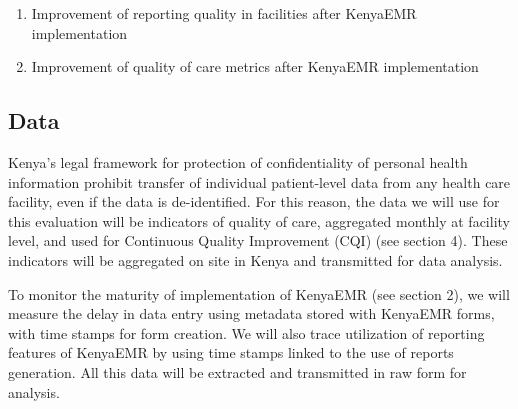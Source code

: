 \documentclass[a4paper,11pt,final,twoside]{article}
\begin{document}
\begin{enumerate}
\item	Improvement of reporting quality in facilities after KenyaEMR implementation
\item	Improvement of quality of care metrics after KenyaEMR implementation
\end{enumerate}

    \subsection{Data}

Kenya’s legal framework for protection of confidentiality of personal health information prohibit transfer of individual patient-level data from any health care facility, even if the data is de-identified. For this reason, the data we will use for this evaluation will be indicators of quality of care, aggregated monthly at facility level, and used for Continuous Quality Improvement (CQI) (see section 4). These indicators will be aggregated on site in Kenya and transmitted for data analysis.

To monitor the maturity of implementation of KenyaEMR (see section 2), we will measure the delay in data entry using metadata stored with KenyaEMR forms, with time stamps for form creation. We will also trace utilization of reporting features of KenyaEMR by using time stamps linked to the use of reports generation. All this data will be extracted and transmitted in raw form for analysis.
\end{document}
